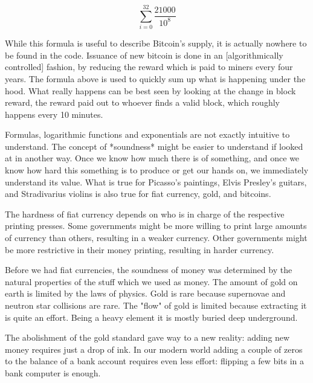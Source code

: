 \begin{equation}
\sum\limits_{i=0}^{32} \frac{21000}{10^8}
\end{equation}


While this formula is useful to describe Bitcoin's supply, it is
actually nowhere to be found in the code. Issuance of new bitcoin is
done in an [algorithmically controlled] fashion, by reducing the reward
which is paid to miners every four years. The formula above is used to
quickly sum up what is happening under the hood. What really happens can
be best seen by looking at the change in block reward, the reward paid
out to whoever finds a valid block, which roughly happens every 10
minutes.


Formulas, logarithmic functions and exponentials are not exactly
intuitive to understand. The concept of *soundness* might be easier to
understand if looked at in another way. Once we know how much there is
of something, and once we know how hard this something is to produce or
get our hands on, we immediately understand its value. What is true for
Picasso's paintings, Elvis Presley's guitars, and Stradivarius violins
is also true for fiat currency, gold, and bitcoins.

The hardness of fiat currency depends on who is in charge of the
respective printing presses. Some governments might be more willing to
print large amounts of currency than others, resulting in a weaker
currency. Other governments might be more restrictive in their money
printing, resulting in harder currency.

Before we had fiat currencies, the soundness of money was determined by
the natural properties of the stuff which we used as money. The amount
of gold on earth is limited by the laws of physics. Gold is rare because
supernovae and neutron star collisions are rare. The "flow" of gold is
limited because extracting it is quite an effort. Being a heavy element
it is mostly buried deep underground.

The abolishment of the gold standard gave way to a new reality: adding
new money requires just a drop of ink. In our modern world adding a
couple of zeros to the balance of a bank account requires even less
effort: flipping a few bits in a bank computer is enough.

